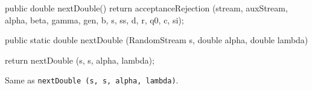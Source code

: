 \begin{code}\begin{hide} 
    
   public double nextDouble() {
      return acceptanceRejection
       (stream, auxStream, alpha, beta, gamma, gen, b, s, ss, d, r, q0, c, si);
   }\end{hide}

   public static double nextDouble (RandomStream s, double alpha, 
                                    double lambda)\begin{hide} {
      return nextDouble (s, s, alpha, lambda);
   }\end{hide}
\end{code}
 \begin{tabb}  
   Same as \texttt{nextDouble (s, s, alpha, lambda)}.
 \end{tabb}
